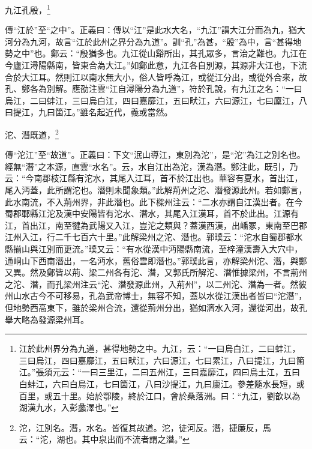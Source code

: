 九江孔殷，\footnote{江於此州界分為九道，甚得地勢之中。九江，云：“一曰烏白江，二曰蚌江，三曰烏江，四曰嘉靡江，五曰畎江，六曰源江，七曰累江，八曰提江，九曰箘江。”張須元云：“一曰三里江，二曰五州江，三曰嘉靡江，四曰烏土江，五曰白蚌江，六曰白烏江，七曰箘江，八曰沙提江，九曰廩江。參差隨水長短，或百里，或五十里。始於鄂陵，終於江口，會於桑落洲。曰：“九江，劉歆以為湖漢九水，入彭蠡澤也。”}

{\noindent\zhuan{}\fzbyks 傳“江於”至“之中”。正義曰：傳以“江”是此水大名，“九江”謂大江分而為九，猶大河分為九河，故言“江於此州之界分為九道”。訓“孔”為甚，“殷”為中，言“甚得地勢之中”也。鄭云：“殷猶多也。九江從山谿所出，其孔眾多，言治之難也。九江在今廬江潯陽縣南，皆東合為大江。”如鄭此意，九江各自別源，其源非大江也，下流合於大江耳。然則江以南水無大小，俗人皆呼為江，或從江分出，或從外合來，故孔、鄭各為別解。應劭注雲“江自潯陽分為九道”，符於孔說，有九江之名：“一曰烏江，二曰蚌江，三曰烏白江，四曰嘉靡江，五曰畎江，六曰源江，七曰廩江，八曰提江，九曰箘江。”雖名起近代，義或當然。 \par}

沱、潛既道，\footnote{沱，江別名。潛，水名。皆復其故道。沱，徒河反。潛，捷廉反，馬云：“沱，湖也。其中泉出而不流者謂之潛。”}

{\noindent\zhuan{}\fzbyks 傳“沱江”至“故道”。正義曰：下文“泯山導江，東別為沱”，是“沱”為江之別名也。經無“潛”之本源，直雲“水名”。云，水自江出為沱，漢為潛。鄭注此，既引，乃云：“今南郡枝江縣有沱水，其尾入江耳，首不於江出也。華容有夏水，首出江，尾入沔蓋，此所謂沱也。潛則未聞象類。”此解荊州之沱、潛發源此州。若如鄭言，此水南流，不入荊州界，非此潛也。此下樑州注云：“二水亦謂自江漢出者。在今蜀郡鄆縣江沱及漢中安陽皆有沱水、潛水，其尾入江漢耳，首不於此出。江源有𨞪江，首出江，南至犍為武陽又入江，豈沱之類與？蓋漢西漢，出嶓冢，東南至巴郡江州入江，行二千七百六十里。”此解梁州之沱、潛也。郭璞云：“沱水自蜀郡都水縣揃山與江別而更流。”璞又云：“有水從漢中沔陽縣南流，至梓潼漢壽入大穴中，通峒山下西南潛出，一名沔水，舊俗雲即潛也。”郭璞此言，亦解梁州沱、潛，與鄭又異。然及鄭皆以荊、梁二州各有沱、潛，又郭氏所解沱、潛惟據梁州，不言荊州之沱、潛，而孔梁州注云“沱、潛發源此州，入荊州”，以二州沱、潛為一者。然彼州山水古今不可移易，孔為武帝博士，無容不知，蓋以水從江漢出者皆曰“沱潛”，但地勢西高東下，雖於梁州合流，還從荊州分出，猶如濟水入河，還從河出，故孔舉大略為發源梁州耳。 \par}

